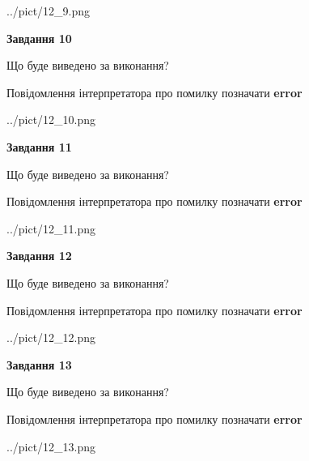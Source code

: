 \documentclass[11pt, ukrainian]{article}
\begin{document}
{\begin {large}
\begin{center}
	{../pict/12_9.png}
\end{center}
\newpage

{\begin {center}\textbf{Завдання 10}\end {center}}\par
Що буде виведено за виконання? \par
Повідомлення інтерпретатора про помилку позначати \textbf{error}

\begin{center}
	{../pict/12_10.png}
\end{center}
\newpage

{\begin {center}\textbf{Завдання 11}\end {center}}\par
Що буде виведено за виконання? \par
Повідомлення інтерпретатора про помилку позначати \textbf{error}

\begin{center}
	{../pict/12_11.png}
\end{center}
\newpage

{\begin {center}\textbf{Завдання 12}\end {center}}\par
Що буде виведено за виконання? \par
Повідомлення інтерпретатора про помилку позначати \textbf{error}

\begin{center}
	{../pict/12_12.png}
\end{center}
\newpage

{\begin {center}\textbf{Завдання 13}\end {center}}\par
Що буде виведено за виконання? \par
Повідомлення інтерпретатора про помилку позначати \textbf{error}

\begin{center}
	{../pict/12_13.png}
\end{center}
\newpage


\end{large}}
\end{document}
